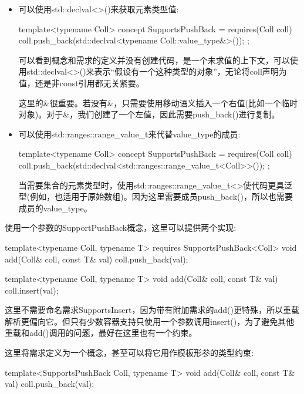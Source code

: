 \begin{itemize}
\item
可以使用std::declval<>()来获取元素类型值:

\begin{cpp}
template<typename Coll>
concept SupportsPushBack = requires(Coll coll) {
	coll.push_back(std::declval<typename Coll::value_type&>());
};
\end{cpp}

可以看到概念和需求的定义并没有创建代码，是一个未求值的上下文，可以使用std::declval<>()来表示“假设有一个这种类型的对象”，无论将coll声明为值，还是非const引用都无关紧要。

这里的\&很重要。若没有\&，只需要使用移动语义插入一个右值(比如一个临时对象)。对于\&，我们创建了一个左值，因此需要push\_back()进行复制。

\item
可以使用std::ranges::range\_value\_t来代替value\_type的成员:

\begin{cpp}
template<typename Coll>
concept SupportsPushBack = requires(Coll coll) {
	coll.push_back(std::declval<std::ranges::range_value_t<Coll>>());
};
\end{cpp}

当需要集合的元素类型时，使用std::ranges::range\_value\_t<>使代码更具泛型(例如，也适用于原始数组)。因为这里需要成员push\_back()，所以也需要成员的value\_type。

\end{itemize}

使用一个参数的SupportPushBack概念，这里可以提供两个实现:

\begin{cpp}
template<typename Coll, typename T>
requires SupportsPushBack<Coll>
void add(Coll& coll, const T& val)
{
	coll.push_back(val);
}

template<typename Coll, typename T>
void add(Coll& coll, const T& val)
{
	coll.insert(val);
}
\end{cpp}

这里不需要命名需求SupportsInsert，因为带有附加需求的add()更特殊，所以重载解析更偏向它。但只有少数容器支持只使用一个参数调用insert()，为了避免其他重载和add()调用的问题，最好在这里也有一个约束。

这里将需求定义为一个概念，甚至可以将它用作模板形参的类型约束:

\begin{cpp}
template<SupportsPushBack Coll, typename T>
void add(Coll& coll, const T& val)
{
	coll.push_back(val);
}
\end{cpp}

